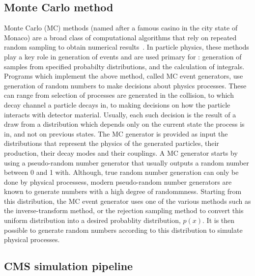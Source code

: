 \subsection{Monte Carlo method}

Monte Carlo (MC) methods (named after a famous casino in the city state of Monaco) are a broad class of computational algorithms that rely on repeated random sampling to obtain numerical results~\cite{mcwiki}. In particle physics, these methods play a key role in generation of events and are used primary for : generation of samples from specified probabilty distributions, and the calculation of integrals. Programs which implement the above method, called MC event generators, use generation of random numbers to make decisions about physics processes. These can range from selection of processes are generated in the collision, to which decay channel a particle decays in, to making decisions on how the particle interacts with detector material. Usually, each such decision is the result of a draw from a distribution which depends only on the current state the process is in, and not on previous states. The MC generator is provided as input the distributions that represent the physics of the generated particles, their production, their decay modes and their couplings. A MC generator starts by using a pseudo-random number generator that usually outputs a random number between 0 and 1 with. Although, true random number generation can only be done by physical processess, modern pseudo-random number generators are known to generate numbers with a high degree of randommness. Starting from this distribution, the MC event generator uses one of the various methods such as the inverse-transform method, or the rejection sampling method to convert this uniform distribution into a desired probablity distribution, $p(x)$. It is then possible to generate random numbers according to this distribution to simulate physical processes. 


\subsection{CMS simulation pipeline}

